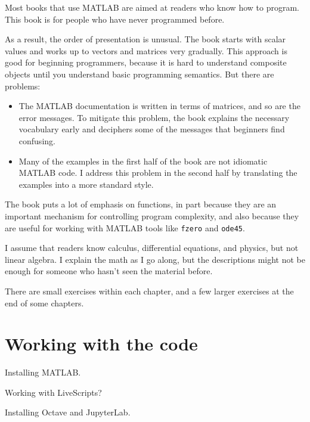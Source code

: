 \documentclass[
]{book}
\begin{document}

Most books that use MATLAB are aimed at readers who know how
to program.  This book is for people who have never programmed
before.

As a result, the order of presentation is unusual.  The book starts
with scalar values and works up to vectors and matrices very
gradually.  This approach is good for beginning programmers, because
it is hard to understand composite objects until you understand basic
programming semantics.  But there are problems:

\begin{itemize}

\item The MATLAB documentation is written in terms of matrices,
and so are the error messages.
To mitigate this problem, the book explains the necessary
vocabulary early and deciphers some of the messages that
beginners find confusing.

\item Many of the examples in the first half of the book are
not idiomatic MATLAB code.  I address this problem in the second
half by translating the examples into a more standard style.

\end{itemize}

The book puts a lot of emphasis on functions, in part because they are
an important mechanism for controlling program complexity, and also
because they are useful for working with MATLAB tools like {\tt fzero}
and {\tt ode45}.

I assume that readers know calculus, differential equations, and
physics, but not linear algebra.  I explain the math as I go along,
but the descriptions might not be enough for someone who hasn't seen
the material before.

There are small exercises within each chapter, and a few larger
exercises at the end of some chapters.

\section*{Working with the code}

Installing MATLAB.

Working with LiveScripts?

Installing Octave and JupyterLab.
\end{document}

